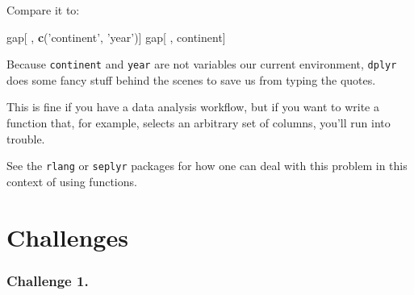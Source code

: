 \documentclass[]{book}
\newenvironment{Shaded}{\begin{snugshade}}{\end{snugshade}}
\newcommand{\CommentTok}[1]{\textcolor[rgb]{0.56,0.35,0.01}{\textit{#1}}}
\newcommand{\ControlFlowTok}[1]{\textcolor[rgb]{0.13,0.29,0.53}{\textbf{#1}}}
\newcommand{\DataTypeTok}[1]{\textcolor[rgb]{0.13,0.29,0.53}{#1}}
\newcommand{\KeywordTok}[1]{\textcolor[rgb]{0.13,0.29,0.53}{\textbf{#1}}}
\newcommand{\NormalTok}[1]{#1}
\newcommand{\OperatorTok}[1]{\textcolor[rgb]{0.81,0.36,0.00}{\textbf{#1}}}
\newcommand{\StringTok}[1]{\textcolor[rgb]{0.31,0.60,0.02}{#1}}
\begin{document}
Compare it to:

\begin{Shaded}
\begin{Highlighting}[]
\NormalTok{gap[ , }\KeywordTok{c}\NormalTok{(}\StringTok{'continent'}\NormalTok{, }\StringTok{'year'}\NormalTok{)]}
\NormalTok{gap[ , continent]}
\end{Highlighting}
\end{Shaded}

Because \texttt{continent} and \texttt{year} are not variables our current environment, \texttt{dplyr} does some fancy stuff behind the scenes to save us from typing the quotes.

This is fine if you have a data analysis workflow, but if you want to write a function that, for example, selects an arbitrary set of columns, you'll run into trouble.

\begin{Shaded}
\end{Shaded}

See the \texttt{rlang} or \texttt{seplyr} packages for how one can deal with this problem in this context of using functions.

\hypertarget{challenges-11}{%
\section{Challenges}\label{challenges-11}}

\hypertarget{challenge-1.-6}{%
\subsubsection*{Challenge 1.}\label{challenge-1.-6}}
\end{document}
